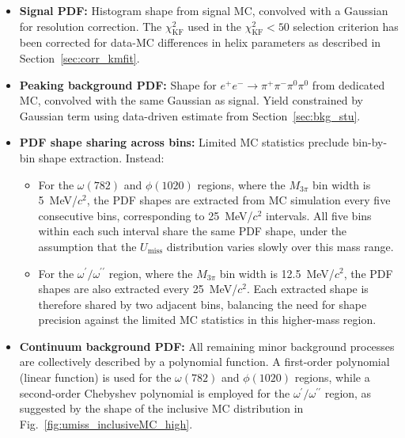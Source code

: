 \begin{itemize}
    \item \textbf{Signal PDF:} Histogram shape from signal MC, convolved with a Gaussian for resolution correction. The $\chi^{2}_{\mathrm{KF}}$ used in the $\chi^{2}_{\mathrm{KF}} < 50$ selection criterion has been corrected for data-MC differences in helix parameters as described in Section~\ref{sec:corr_kmfit}.

    \item \textbf{Peaking background PDF:} Shape for $e^{+}e^{-} \to \pi^{+}\pi^{-}\pi^{0}\pi^{0}$ from dedicated MC, convolved with the same Gaussian as signal. Yield constrained by Gaussian term using data-driven estimate from Section~\ref{sec:bkg_stu}.

    \item \textbf{PDF shape sharing across bins:} Limited MC statistics preclude bin-by-bin shape extraction. Instead:
          \begin{itemize}
              \item For the $\omega(782)$ and $\phi(1020)$ regions, where the $M_{3\pi}$ bin width
                    is 5~MeV/$c^{2}$, the PDF shapes are extracted from MC simulation every five
                    consecutive bins, corresponding to 25~MeV/$c^{2}$ intervals. All five bins
                    within each such interval share the same PDF shape, under the assumption that
                    the $U_{\text{miss}}$ distribution varies slowly over this mass range.

              \item For the $\omega^{\prime}/\omega^{\prime\prime}$ region, where the $M_{3\pi}$
                    bin width is 12.5~MeV/$c^{2}$, the PDF shapes are also extracted every
                    25~MeV/$c^{2}$. Each extracted shape is therefore shared by two adjacent bins,
                    balancing the need for shape precision against the limited MC statistics in
                    this higher-mass region.
          \end{itemize}

    \item \textbf{Continuum background PDF:} All remaining minor background processes are collectively described by a polynomial function. A first-order polynomial (linear function) is used for the $\omega(782)$ and $\phi(1020)$ regions, while a second-order Chebyshev polynomial is employed for the $\omega^{\prime}/\omega^{\prime\prime}$ region, as suggested by the shape of the inclusive MC distribution in Fig.~\ref{fig:umiss_inclusiveMC_high}.
\end{itemize}

